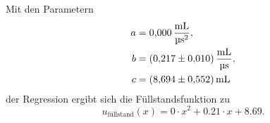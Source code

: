 \noindent Mit den Parametern 
\begin{align}
    a &= \qty{0.000(0.000)}{\frac{\milli\liter}{\micro\second^2}}, \\
    b &= \qty{0.217(0.010)}{\frac{\milli\liter}{\micro\second}}, \\
    c &= \qty{8.694(0.552)}{\milli\liter}
\end{align}
der Regression ergibt sich die Füllstandsfunktion zu 
\begin{equation}
    u_\text{füllstand}(x) = 0 \cdot x^2 + 0.21 \cdot x + 8.69.
\end{equation}

